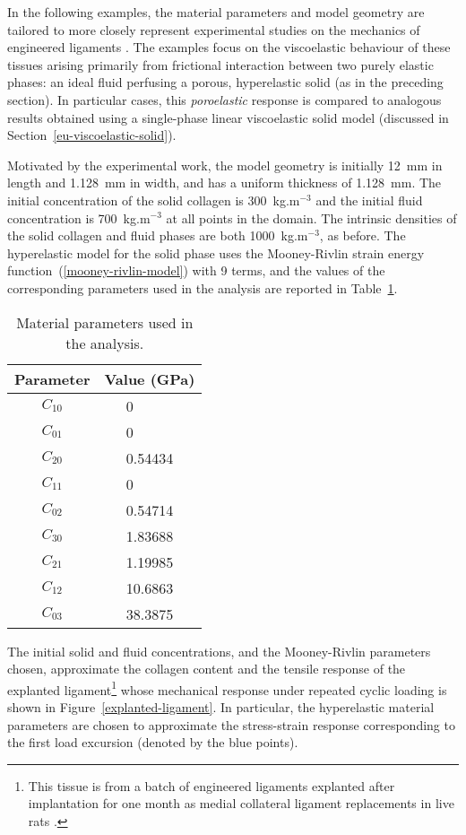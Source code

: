 In the following examples, the material parameters and model geometry
are tailored to more closely represent experimental studies on the
mechanics of engineered ligaments \citep{ma:07}. The examples focus on
the viscoelastic behaviour of these tissues arising primarily from
frictional interaction between two purely elastic phases: an ideal
fluid perfusing a porous, hyperelastic solid (as in the preceding
section). In particular cases, this {\em poroelastic} response is
compared to analogous results obtained using a single-phase linear
viscoelastic solid model (discussed in
Section~\ref{eu-viscoelastic-solid}).

Motivated by the experimental work, the model geometry is initially
12~mm in length and 1.128~mm in width, and has a uniform thickness of
1.128~mm. The initial concentration of the solid collagen is
300~kg.m$^{-3}$ and the initial fluid concentration is 700~kg.m$^{-3}$
at all points in the domain. The intrinsic densities of the solid
collagen and fluid phases are both 1000~kg.m$^{-3}$, as before. The
hyperelastic model for the solid phase uses the Mooney-Rivlin strain
energy function~(\ref{mooney-rivlin-model}) with 9 terms, and the
values of the corresponding parameters used in the analysis are
reported in Table~\ref{parameters-explant}.

\begin{table}[!hptb]
  \centering
  \begin{tabular}{|c|c|}
    \hline Parameter & Value (GPa) \\
    \hline \hline
    $C_{10}$  &   0$\phantom{.00000}$  \\
    $C_{01}$  &   0$\phantom{.00000}$  \\
    $C_{20}$  &   0.54434  \\
    $C_{11}$  &   0$\phantom{.00000}$  \\
    $C_{02}$  &   0.54714  \\
    $C_{30}$  &   1.83688  \\
    $C_{21}$  &   1.19985  \\
    $C_{12}$  &   10.6863  \\
    $C_{03}$  &   38.3875  \\
    \hline
  \end{tabular}
  \caption{Material parameters used in the analysis.}
  \label{parameters-explant}
\end{table}

The initial solid and fluid concentrations, and the Mooney-Rivlin
parameters chosen, approximate the collagen content and the tensile
response of the explanted ligament\footnote{This tissue is from a
  batch of engineered ligaments explanted after implantation for one
  month as medial collateral ligament replacements in live rats
  \citep{ma:07}.} whose mechanical response under repeated cyclic
loading is shown in Figure~\ref{explanted-ligament}. In particular,
the hyperelastic material parameters are chosen to approximate the
stress-strain response corresponding to the first load excursion
(denoted by the blue points).

